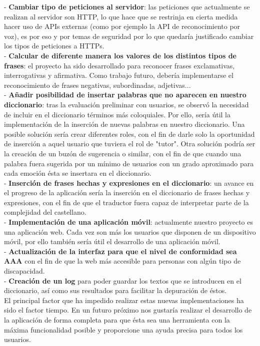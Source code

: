 - \textbf{Cambiar tipo de peticiones al servidor}: las peticiones que actualmente se realizan al servidor son HTTP, lo que hace que se restrinja en cierta medida hacer uso de APIs externas (como por ejemplo la API de reconocimiento por voz), es por eso y por temas de seguridad por lo que quedaría justificado cambiar los tipos de peticiones a HTTPs.\\



- \textbf{Calcular de diferente manera los valores de los distintos tipos de frases}: el proyecto ha sido desarrollado para reconocer frases exclamativas, interrogativas y afirmativa. Como trabajo futuro, debería implementarse el reconocimiento de frases negativas, subordinadas, adjetivas... \\


- \textbf{Añadir posibilidad de insertar palabras que no aparecen en nuestro diccionario}: tras la evaluación preliminar con usuarios, se observó la necesidad de incluir en el diccionario términos más coloquiales. Por ello, sería útil la implementación de la inserción de nuevas palabras en nuestro diccionario. Una posible solución sería crear diferentes roles, con el fin de darle solo la oportunidad de inserción a aquel usuario que tuviera el rol de "tutor". Otra solución podría ser la creación de un buzón de sugerencia o similar, con el fin de que cuando una palabra fuera sugerida por un mínimo de usuarios con un grado aproximado para cada emoción ésta se insertara en el diccionario.\\


-\textbf{ Inserción de frases hechas y expresiones en el diccionario}:  un avance en el progreso de la aplicación sería la inserción en el diccionario de frases hechas y expresiones, con el fin de que el traductor fuera capaz de interpretar parte de la complejidad del castellano.\\



- \textbf{Implementación de una aplicación móvil}: actualmente nuestro proyecto es una aplicación web. Cada vez son más los usuarios que disponen de un dispositivo móvil, por ello también sería útil el desarrollo de una aplicación móvil.\\

- \textbf{Actualización de la interfaz para que el nivel de conformidad sea AAA} con el fin de que la web más accesible para personas con algún tipo de discapacidad.  \\




- \textbf{Creación de un log} para poder guardar los textos que se introducen en el diccionario, así como sus resultados para facilitar la depuración de éstos.\\


El principal factor que ha impedido realizar estas nuevas implementaciones ha sido el factor tiempo.  En un futuro próximo nos gustaría realizar el desarrollo de la aplicación de forma completa para que ésta sea una herramienta con la máxima funcionalidad posible y proporcione una ayuda precisa para todos los usuarios.\\


